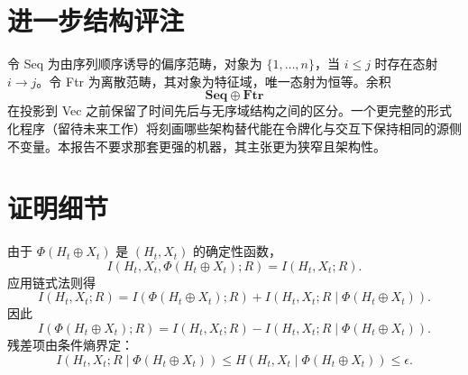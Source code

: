 \documentclass{article}
\begin{document}
\appendix

\section{进一步结构评注}

令 Seq 为由序列顺序诱导的偏序范畴，对象为 \(\{1,\ldots,n\}\)，当 \(i \le j\) 时存在态射 \(i \to j\)。令 Ftr 为离散范畴，其对象为特征域，唯一态射为恒等。余积
\[
\mathbf{Seq} \oplus \mathbf{Ftr}
\]
在投影到 Vec 之前保留了时间先后与无序域结构之间的区分。一个更完整的形式化程序（留待未来工作）将刻画哪些架构替代能在令牌化与交互下保持相同的源侧不变量。本报告不要求那套更强的机器，其主张更为狭窄且架构性。

\section{证明细节}

由于 \(\Phi(H_t \oplus X_t)\) 是 \((H_t,X_t)\) 的确定性函数，
\[
I(H_t,X_t,\Phi(H_t \oplus X_t); R) = I(H_t,X_t; R).
\]
应用链式法则得
\[
I(H_t,X_t; R) = I(\Phi(H_t \oplus X_t); R) + I(H_t,X_t; R \mid \Phi(H_t \oplus X_t)).
\]
因此
\[
I(\Phi(H_t \oplus X_t); R) = I(H_t,X_t; R) - I(H_t,X_t; R \mid \Phi(H_t \oplus X_t)).
\]
残差项由条件熵界定：
\[
I(H_t,X_t; R \mid \Phi(H_t \oplus X_t)) \le H(H_t,X_t \mid \Phi(H_t \oplus X_t)) \le \epsilon.
\]
\end{document}

